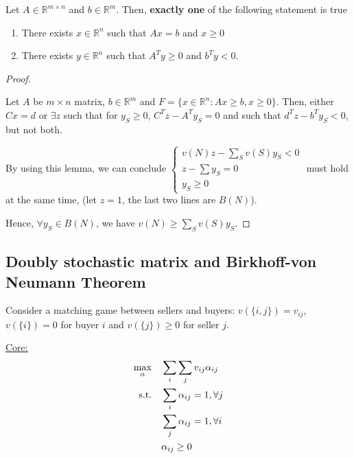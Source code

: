 \documentclass[11pt]{elegantbook}
\begin{document}
\begin{lemma}
    Let $A\in \mathbb{R}^{m\times n}$ and $b\in \mathbb{R}^m$. Then, \textbf{exactly one} of the following statement is true
    \begin{enumerate}[(1).]
        \item There exists $x\in \mathbb{R}^n$ such that $Ax=b$ and $x\geq 0$
        \item There exists $y\in \mathbb{R}^n$ such that $A^Ty\geq 0$ and $b^T y<0$.
    \end{enumerate}
\end{lemma}

\begin{lemma}

\end{lemma}

\begin{proof}
    \begin{lemma}
        Let $A$ be $m\times n$ matrix, $b\in \mathbb{R}^m$ and $F=\{x\in \mathbb{R}^n: Ax\geq b,x\geq 0\}$. Then, either $Cx=d$ or $\exists z$ such that for $y_S\geq 0$, $C^Tz-A^Ty_S=0$ and such that $d^Tz-b^Ty_S<0$, but not both.
    \end{lemma}
    By using this lemma, we can conclude $\left\{\begin{matrix}
        v(N)z-\sum_S v(S)y_S<0\\
        z-\sum{y_S}=0\\
        y_S\geq 0
    \end{matrix}\right.$ must hold at the same time, (let $z=1$, the last two lines are $B(N)$).

    Hence, $\forall y_S\in B(N)$, we have $v(N)\geq \sum_S v(S)y_S$.
\end{proof}


\subsection{Doubly stochastic matrix and Birkhoff-von Neumann Theorem}

Consider a matching game between sellers and buyers: $v(\{i,j\})=v_{ij}$, $v(\{i\})=0$ for buyer $i$ and $v(\{j\})\geq 0$ for seller $j$.

\underline{Core:}
\begin{equation}
    \begin{aligned}
        \max_{\alpha}\quad &\sum_i\sum_j v_{ij}\alpha_{ij}\\
        \textnormal{s.t.}\quad&\sum_{i}\alpha_{ij}=1,\forall j\\
        &\sum_{j}\alpha_{ij}=1,\forall i\\
        &\alpha_{ij}\geq 0
    \end{aligned}
    \nonumber
\end{equation}
\end{document}
